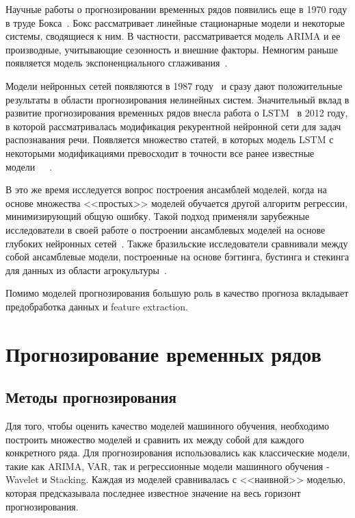 \documentclass[a4paper,article,14pt]{extarticle}
\begin{document}
Научные работы о прогнозировании временных рядов появились еще в 1970 году в труде Бокса~\cite{box}.
Бокс рассматривает линейные стационарные модели и некоторые системы, сводящиеся к ним.
В частности, рассматривается модель ARIMA и ее производные, учитывающие сезонность и внешние факторы.
Немногим раньше появляется модель экспоненциального сглаживания~\cite{expsmooth}.
\par
Модели нейронных сетей появляются в 1987 году~\cite{firstnn} и сразу дают положительные результаты в области прогнозирования нелинейных систем.
Значительный вклад в развитие прогнозирования временных рядов внесла работа о LSTM~\cite{lstm} в 2012 году, в которой рассматривалась модификация рекурентной нейронной сети для задач распознавания речи.
Появляется множество статей, в которых модель LSTM с некоторыми модификациями превосходит в точности все ранее известные модели~\cite{lstm_ex1}~\cite{lstm_ex2}~\cite{lstm_ex3}.
\par
В это же время исследуется вопрос построения ансамблей моделей, когда на основе множества <<простых>> моделей обучается другой алгоритм регрессии, минимизирующий общую ошибку.
Такой подход применяли зарубежные исследователи в своей работе о построении ансамблевых моделей на основе глубоких нейронных сетей~\cite{ensemble_dl}.
Также бразильские исследователи сравнивали между собой ансамблевые модели, построенные на основе бэггинга, бустинга и стекинга для данных из области агрокультуры~\cite{ensemble_agri}.
\par
Помимо моделей прогнозирования большую роль в качество прогноза вкладывает предобработка данных и feature extraction. %


\pagebreak
\section{Прогнозирование временных рядов}

\subsection{Методы прогнозирования}

Для того, чтобы оценить качество моделей машинного обучения, необходимо построить множество моделей и сравнить их между собой для каждого конкретного ряда.
Для прогнозирования использовались как классические модели, такие как ARIMA, VAR, так и регрессионные модели машинного обучения - Wavelet и Stacking.
Каждая из моделей сравнивалась с <<наивной>> моделью, которая предсказывала последнее известное значение на весь горизонт прогнозирования.
\end{document}
